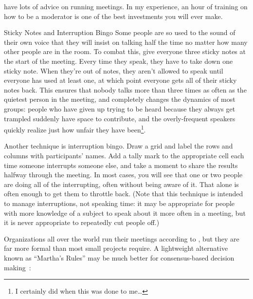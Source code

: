 \cite{Brow2007,Broo2016,Roge2018} have lots of advice on running meetings.
In my experience,
an hour of training on how to be a moderator
is one of the best investments you will ever make.

\begin{aside}{Sticky Notes and Interruption Bingo}
  Some people are so used to the sound of their own voice
  that they will insist on talking half the time
  no matter how many other people are in the room.
  To combat this,
  give everyone three sticky notes at the start of the meeting.
  Every time they speak,
  they have to take down one sticky note.
  When they're out of notes,
  they aren't allowed to speak until everyone has used at least one,
  at which point everyone gets all of their sticky notes back.
  This ensures that nobody talks more than three times as often as
  the quietest person in the meeting,
  and completely changes the dynamics of most groups:
  people who have given up trying to be heard because they always get trampled
  suddenly have space to contribute,
  and the overly-frequent speakers quickly realize just how unfair they have been\footnote{
    I certainly did when this was done to me{\ldots}
  }.

  Another technique is interruption bingo.
  Draw a grid and label the rows and columns with participants' names.
  Add a tally mark to the appropriate cell
  each time someone interrupts someone else,
  and take a moment to share the results halfway through the meeting.
  In most cases,
  you will see that one or two people are doing all of the interrupting,
  often without being aware of it.
  That alone is often enough to get them to throttle back.
  (Note that this technique is intended to manage interruptions,
  not speaking time:
  it may be appropriate for people with more knowledge of a subject
  to speak about it more often in a meeting,
  but it is never appropriate to repeatedly cut people off.)
\end{aside}


Organizations all over the world run their meetings according to
,
but they are far more formal than most small projects require.
A lightweight alternative known as ``Martha's Rules''
may be much better for consensus-based decision making~\cite{Mina1986}:

